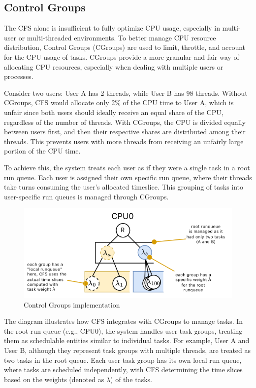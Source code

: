 \subsection{Control Groups}
The CFS alone is insufficient to fully optimize CPU usage, especially in multi-user or multi-threaded environments. 
To better manage CPU resource distribution, Control Groups (CGroups) are used to limit, throttle, and account for the CPU usage of tasks. 
CGroups provide a more granular and fair way of allocating CPU resources, especially when dealing with multiple users or processes.
\begin{example}
    Consider two users: User A has 2 threads, while User B has 98 threads. 
    Without CGroups, CFS would allocate only 2\% of the CPU time to User A, which is unfair since both users should ideally receive an equal share of the CPU, regardless of the number of threads. 
    With CGroups, the CPU is divided equally between users first, and then their respective shares are distributed among their threads. 
    This prevents users with more threads from receiving an unfairly large portion of the CPU time.
\end{example}
To achieve this, the system treats each user as if they were a single task in a root run queue. 
Each user is assigned their own specific run queue, where their threads take turns consuming the user's allocated timeslice. 
This grouping of tasks into user-specific run queues is managed through CGroups.
\begin{figure}[H]
    \centering
    \includegraphics[width=0.75\linewidth]{images/cgroup.png}
    \caption{Control Groups implementation}
\end{figure}
The diagram illustrates how CFS integrates with CGroups to manage tasks. 
In the root run queue (e.g., CPU0), the system handles user task groups, treating them as schedulable entities similar to individual tasks. 
For example, User A and User B, although they represent task groups with multiple threads, are treated as two tasks in the root queue. 
Each user task group has its own local run queue, where tasks are scheduled independently, with CFS determining the time slices based on the weights (denoted as $\lambda$) of the tasks.

